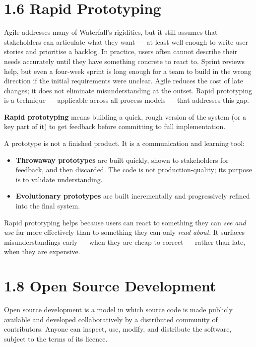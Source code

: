 \documentclass[11pt,a4paper]{book}
\begin{document}
\section{1.6 Rapid Prototyping}

Agile addresses many of Waterfall's rigidities, but it still assumes that stakeholders can articulate what they want --- at least well enough to write user stories and prioritise a backlog. In practice, users often cannot describe their needs accurately until they have something concrete to react to. Sprint reviews help, but even a four-week sprint is long enough for a team to build in the wrong direction if the initial requirements were unclear. Agile reduces the cost of late changes; it does not eliminate misunderstanding at the outset. Rapid prototyping is a technique --- applicable across all process models --- that addresses this gap.

\textbf{Rapid prototyping} means building a quick, rough version of the system (or a key part of it) to get feedback before committing to full implementation.

A prototype is not a finished product. It is a communication and learning tool:

\begin{itemize}
  \item \textbf{Throwaway prototypes} are built quickly, shown to stakeholders for feedback, and then discarded. The code is not production-quality; its purpose is to validate understanding.
  \item \textbf{Evolutionary prototypes} are built incrementally and progressively refined into the final system.
\end{itemize}

Rapid prototyping helps because users can react to something they can \textit{see and use} far more effectively than to something they can only \textit{read about}. It surfaces misunderstandings early --- when they are cheap to correct --- rather than late, when they are expensive.

\medskip

\section{1.8 Open Source Development}

Open source development is a model in which source code is made publicly available and developed collaboratively by a distributed community of contributors. Anyone can inspect, use, modify, and distribute the software, subject to the terms of its licence.
\end{document}
